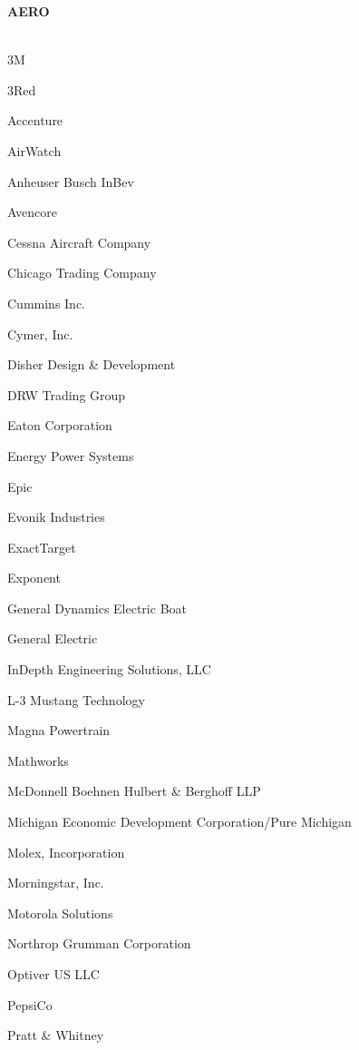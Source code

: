 \documentclass[twoside]{article}
\begin{document}
    \begin{center}\begin{multicols}{5}
    {\fontsize{14}{16}\selectfont \bf AERO}\\
        \vspace{-1em}
        ~\hrulefill~
        \vspace{-.9em}
        \begin{FlushLeft}
        \begin{compactitem}
        \item 3M
\item 3Red
\item Accenture
\item AirWatch
\item Anheuser Busch InBev
\item Avencore
\item Cessna Aircraft Company
\item Chicago Trading Company
\item Cummins Inc.
\item Cymer, Inc.
\item Disher Design \& Development
\item DRW Trading Group
\item Eaton Corporation
\item Energy Power Systems
\item Epic
\item Evonik Industries
\item ExactTarget
\item Exponent
\item General Dynamics Electric Boat
\item General Electric
\item InDepth Engineering Solutions, LLC
\item L-3 Mustang Technology
\item Magna Powertrain
\item Mathworks
\item McDonnell Boehnen Hulbert \& Berghoff LLP
\item Michigan Economic Development Corporation/Pure Michigan
\item Molex, Incorporation
\item Morningstar, Inc.
\item Motorola Solutions
\item Northrop Grumman Corporation
\item Optiver US LLC
\item PepsiCo
\item Pratt \& Whitney

\end{compactitem}
\end{FlushLeft}
\end{multicols}
\end{center}
\end{document}
